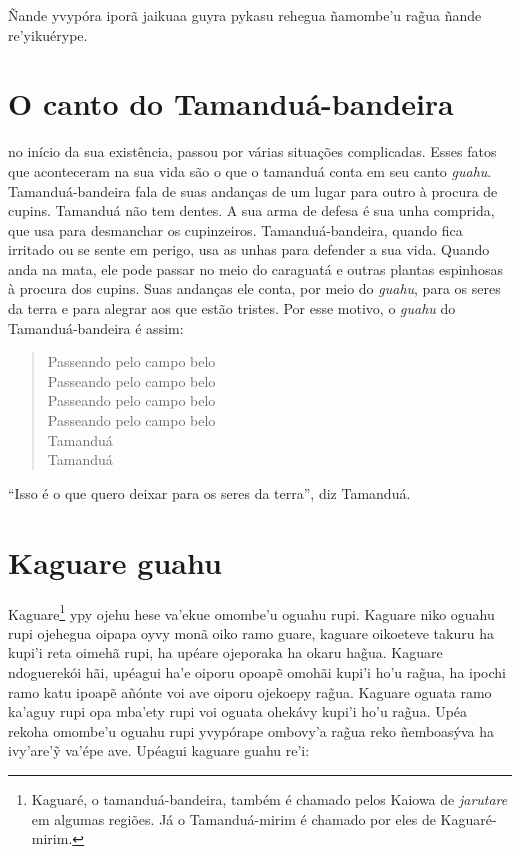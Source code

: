 Ñande yvypóra iporã jaikuaa guyra pykasu rehegua ñamombe'u rag̃ua ñande
re'yikuérype.

\chapter{O canto do Tamanduá-bandeira}

 no início da sua existência, passou por várias
situações complicadas. Esses fatos que aconteceram na sua vida são o que
o tamanduá conta em seu canto \emph{guahu}. Tamanduá-bandeira fala de
suas andanças de um lugar para outro à procura de cupins. Tamanduá não
tem dentes. A sua arma de defesa é sua unha comprida, que usa para
desmanchar os cupinzeiros. Tamanduá-bandeira, quando fica irritado ou se
sente em perigo, usa as unhas para defender a sua vida. Quando anda na
mata, ele pode passar no meio do caraguatá e outras plantas espinhosas à
procura dos cupins. Suas andanças ele conta, por meio do \emph{guahu},
para os seres da terra e para alegrar aos que estão tristes. Por esse
motivo, o \emph{guahu} do Tamanduá-bandeira é assim:

\begin{verse}
Passeando pelo campo belo\\
Passeando pelo campo belo\\
Passeando pelo campo belo\\
Passeando pelo campo belo\\
Tamanduá\\
Tamanduá
\end{verse}

``Isso é o que quero deixar para os seres da terra'', diz Tamanduá.

\chapter{Kaguare guahu}

Kaguare\footnote{Kaguaré, o tamanduá-bandeira, também é chamado pelos
  Kaiowa de \emph{jarutare} em algumas regiões. Já o Tamanduá-mirim é
  chamado por eles de Kaguaré-mirim.} ypy ojehu hese va'ekue omombe'u
oguahu rupi. Kaguare niko oguahu rupi ojehegua oipapa oyvy monã oiko
ramo guare, kaguare oikoeteve takuru ha kupi'i reta oimehã rupi, ha
upéare ojeporaka ha okaru hag̃ua. Kaguare ndoguerekói hãi, upéagui ha'e
oiporu opoapẽ omohãi kupi'i ho'u rag̃ua, ha ipochi ramo katu ipoapẽ
añónte voi ave oiporu ojekoepy rag̃ua. Kaguare oguata ramo ka'aguy rupi
opa mba'ety rupi voi oguata ohekávy kupi'i ho'u rag̃ua. Upéa rekoha
omombe'u oguahu rupi yvypórape ombovy'a rag̃ua reko ñemboasýva ha
ivy'are'ỹ va'épe ave. Upéagui kaguare guahu re'i:


